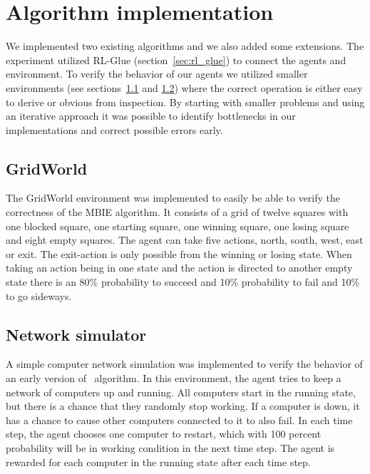 \section{Algorithm implementation}
\label{sec:implementation}

We implemented two existing algorithms and we also added some extensions.  The
experiment utilized RL-Glue (section~\ref{sec:rl_glue}) to connect the agents
and environment.  To verify the behavior of our agents we utilized smaller
environments (see sections~\ref{sec:intro_grid_world} and \ref{sec:ns}) where
the correct operation is either easy to derive or obvious from inspection. By
starting with smaller problems and using an iterative approach it was possible
to identify bottlenecks in our implementations and correct possible errors
early.





\subsection{GridWorld}
\label{sec:intro_grid_world}

The GridWorld environment was implemented to easily be able to verify the
correctness of the MBIE algorithm. It consists of a grid of twelve squares with
one blocked square, one starting square, one winning square, one losing square and
eight empty squares. The agent can take five actions, north, south, west,
east or exit. The exit-action is only possible from the winning or losing
state. When taking an action being in one state and the action is directed to
another empty state there is an 80\% probability to succeed and 10\%
probability to fail and 10\% to go sideways.

\subsection{Network simulator}
\label{sec:ns}

A simple computer network simulation was implemented to verify the behavior of an
early version of \etre\ algorithm. In this environment, the agent tries to keep
a network of computers up and running. All computers start in the running
state, but there is a chance that they randomly stop working. If a computer is
down, it has a chance to cause other computers connected to it to also fail. In
each time step, the agent chooses one computer to restart, which with 100
percent probability will be in working condition in the next time step. The
agent is rewarded for each computer in the running state after each time step. 
